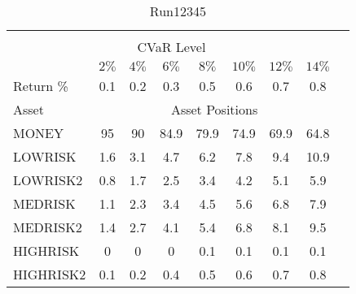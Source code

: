 \begin{table}[h!t]
\caption{Run12345}
\centering
\begin{tabular}[t]{ l c c c c c c c c }
\hline\hline \\
\multicolumn{8}{c}{CVaR Level} \\
 & $2\%$ & $4\%$ & $6\%$ & $8\%$ & $10\%$ & $12\%$ & $14\%$ \\[0.5ex]
Return \% &0.1 &0.2 &0.3 &0.5 &0.6 &0.7 &0.8\\[0.5ex]
Asset & \multicolumn{7}{c}{Asset Positions} \\[1ex]
MONEY & 95 & 90 & 84.9 & 79.9 & 74.9 & 69.9 & 64.8\\
LOWRISK & 1.6 & 3.1 & 4.7 & 6.2 & 7.8 & 9.4 & 10.9\\
LOWRISK2 & 0.8 & 1.7 & 2.5 & 3.4 & 4.2 & 5.1 & 5.9\\
MEDRISK & 1.1 & 2.3 & 3.4 & 4.5 & 5.6 & 6.8 & 7.9\\
MEDRISK2 & 1.4 & 2.7 & 4.1 & 5.4 & 6.8 & 8.1 & 9.5\\
HIGHRISK & 0 & 0 & 0 & 0.1 & 0.1 & 0.1 & 0.1\\
HIGHRISK2 & 0.1 & 0.2 & 0.4 & 0.5 & 0.6 & 0.7 & 0.8\\
[1ex] \hline
\end{tabular}
\end{table} 